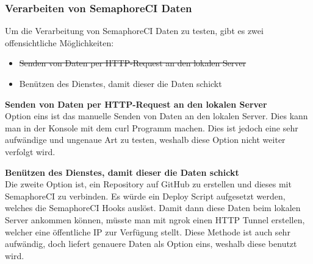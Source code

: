 \begin{minipage}{\textwidth}
  \subsubsection{Verarbeiten von SemaphoreCI Daten}
  Um die Verarbeitung von SemaphoreCI Daten zu testen, gibt es zwei offensichtliche Möglichkeiten:
  \begin{itemize}
    \item \st{Senden von Daten per HTTP-Request an den lokalen Server}
    \item Benützen des Dienstes, damit dieser die Daten schickt
  \end{itemize}
  \textbf{Senden von Daten per HTTP-Request an den lokalen Server} \\
  Option eins ist das manuelle Senden von Daten an den lokalen Server. Dies kann man in der Konsole mit dem curl Programm
  \cite{everything_curl} machen. Dies ist jedoch eine sehr aufwändige und ungenaue Art zu testen, weshalb diese Option nicht
  weiter verfolgt wird. \newline

  \textbf{Benützen des Dienstes, damit dieser die Daten schickt} \\
  Die zweite Option ist, ein Repository auf GitHub zu erstellen und dieses mit SemaphoreCI zu verbinden. Es würde ein Deploy
  Script aufgesetzt werden, welches die SemaphoreCI Hooks auslöst. \newline
  Damit dann diese Daten beim lokalen Server ankommen können, müsste man mit ngrok \cite{ngrok_http_docs} einen HTTP Tunnel
  erstellen, welcher eine öffentliche IP zur Verfügung stellt. \newline
  Diese Methode ist auch sehr aufwändig, doch liefert genauere Daten als Option eins, weshalb diese benutzt wird. \newline
\end{minipage}

